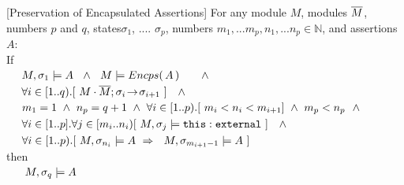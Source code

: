 \begin{auxLemma}
\label{lemma:external_exec_preserves}[Preservation of Encapsulated Assertions]
For any module $M$, modules $\overline{M}$, numbers $p$ and $q$, states$\sigma_1$, .... $\sigma_p$,  numbers $m_1,...m_p, n_1, ... n_p \in \mathbb{N}$, and assertions $A$:
\\
If \\
$\strut \ \ \ \  M, \sigma_1 \models  A   \  \ \wedge \ \ M \models \encaps A \ \ \ \  \ \ \wedge$\\
$\strut \ \ \ \  \forall i\in [1..q).[\   M\cdot \overline{M};\sigma_i\! \rightarrow\! {\sigma_{i+1}}\  ] \  \ \ \wedge$\\
$\strut \ \ \ \  m_1=1 \ \wedge\ n_p=q+1 \  \wedge\ \forall i\in[1..p).[  \  m_i < n_i < m_{i+1}  ] \ \wedge \ m_p<n_p\ \ \wedge  $\\
$\strut \ \ \ \  \forall i\in[1..p].\forall j\in [m_i..n_i)[\   M,\sigma_j \models \texttt{this}:\mbox{\normalfont{\texttt{external}}} \ ] \  \ \ \wedge$\\
$\strut \ \ \ \ \forall i\in[1..p). [ \ M,\sigma_{n_i} \models A   \ \Rightarrow \ \ 
M, {\sigma_{m_{i+1}-1}} \models A  \ ] $ \\
then\\
$\strut \ \ \ \  \ M, \sigma_q \models  A$
\end{auxLemma}



